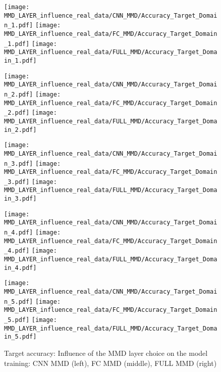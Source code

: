 \begin{figure}[H]
  \centering

  \texttt{[image: MMD\_LAYER\_influence\_real\_data/CNN\_MMD/Accuracy\_Target\_Domain\_1.pdf]}
  \hspace{.1cm}
  \texttt{[image: MMD\_LAYER\_influence\_real\_data/FC\_MMD/Accuracy\_Target\_Domain\_1.pdf]}
  \hspace{.1cm}
  \texttt{[image: MMD\_LAYER\_influence\_real\_data/FULL\_MMD/Accuracy\_Target\_Domain\_1.pdf]}

  \vspace{.3cm}

  \texttt{[image: MMD\_LAYER\_influence\_real\_data/CNN\_MMD/Accuracy\_Target\_Domain\_2.pdf]}
  \hspace{.1cm}
  \texttt{[image: MMD\_LAYER\_influence\_real\_data/FC\_MMD/Accuracy\_Target\_Domain\_2.pdf]}
  \hspace{.1cm}
  \texttt{[image: MMD\_LAYER\_influence\_real\_data/FULL\_MMD/Accuracy\_Target\_Domain\_2.pdf]}

  \vspace{.3cm}

  \texttt{[image: MMD\_LAYER\_influence\_real\_data/CNN\_MMD/Accuracy\_Target\_Domain\_3.pdf]}
  \hspace{.1cm}
  \texttt{[image: MMD\_LAYER\_influence\_real\_data/FC\_MMD/Accuracy\_Target\_Domain\_3.pdf]}
  \hspace{.1cm}
  \texttt{[image: MMD\_LAYER\_influence\_real\_data/FULL\_MMD/Accuracy\_Target\_Domain\_3.pdf]}
  
    \vspace{.3cm}

  \texttt{[image: MMD\_LAYER\_influence\_real\_data/CNN\_MMD/Accuracy\_Target\_Domain\_4.pdf]}
  \hspace{.1cm}
  \texttt{[image: MMD\_LAYER\_influence\_real\_data/FC\_MMD/Accuracy\_Target\_Domain\_4.pdf]}
  \hspace{.1cm}
  \texttt{[image: MMD\_LAYER\_influence\_real\_data/FULL\_MMD/Accuracy\_Target\_Domain\_4.pdf]}
  
    \vspace{.3cm}
    
  \texttt{[image: MMD\_LAYER\_influence\_real\_data/CNN\_MMD/Accuracy\_Target\_Domain\_5.pdf]}
  \hspace{.1cm}
  \texttt{[image: MMD\_LAYER\_influence\_real\_data/FC\_MMD/Accuracy\_Target\_Domain\_5.pdf]}
  \hspace{.1cm}
  \texttt{[image: MMD\_LAYER\_influence\_real\_data/FULL\_MMD/Accuracy\_Target\_Domain\_5.pdf]}


  \caption{Target accuracy: Influence of the MMD layer choice on the model training: CNN MMD (left), FC MMD (middle), FULL MMD (right)}
  \label{fig:target_accuracy_MMD_layer}
\end{figure}



